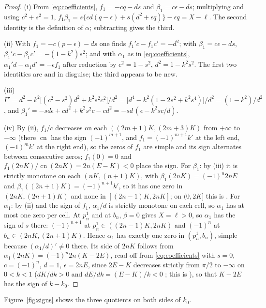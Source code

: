 \documentclass[11pt]{article}
\theoremstyle{remark}
\newcommand{\cn}{\operatorname{cn}}
\begin{document}
\begin{proof}
(i) From \eqref{eq:coefficients}, $f_1=-cq-ds$ and $\beta_1=c\epsilon-ds$;
multiplying and using $c^2+s^2=1$,
$f_1\beta_1=s\{cd(q-\epsilon)+s(d^2+\epsilon q)\}-\epsilon q=X-\ell$.
The second identity is the definition of $\alpha$; subtracting gives the third.

(ii) With $f_1=-c(p-\epsilon)-ds$ one finds $f_1'c-f_1c'=-d^2$; with
$\beta_1=c\epsilon-ds$, $\beta_1'c-\beta_1c'=-(1-k^2)s^2$; and with $\alpha_1$
as in \eqref{eq:coefficients}, $\alpha_1'd-\alpha_1d'=-\epsilon f_1$ after
reduction by $c^2=1-s^2$, $d^2=1-k^2s^2$.  The first two identities are
\cite[Lemma~5.3]{MoiseevSachkov2010Maxwell} and
\cite[Lemma~2.6]{Sachkov2010Conjugate} in disguise; the third appears to be new.

(iii) $\Gamma'=d^2-k^2\bigl[(c^2-s^2)d^2+k^2s^2c^2\bigr]/d^2
=\bigl[d^4-k^2(1-2s^2+k^2s^4)\bigr]/d^2=(1-k^2)/d^2$, and
$\beta_1'=-sd\epsilon+cd^2+k^2s^2c-cd^2=-sd\,(\epsilon-k^2sc/d)$.

(iv) By (ii), $f_1/c$ decreases on each $((2m+1)K,(2m+3)K)$ from
$+\infty$ to $-\infty$ (there $\cn$ has the sign $(-1)^{m+1}$, and
$f_1=(-1)^{m+1}k'$ at the left end, $(-1)^mk'$ at the right end), so
the zeros of $f_1$ are simple and its sign alternates between consecutive
zeros; $f_1(0)=0$ and $f_1(2nK)/\cn(2nK)=2n(E-K)<0$ place the sign.  For $\beta_1$:
by (iii) it is strictly monotone on each $(nK,(n+1)K)$, with
$\beta_1(2nK)=(-1)^n2nE$ and $\beta_1((2n+1)K)=(-1)^{n+1}k'$, so it has one
zero in $(2nK,(2n+1)K)$ and none in $[(2n-1)K,2nK]$; on $(0,2K]$ this is
\cite[Lemma~2.6]{Sachkov2010Conjugate}.  For $\alpha_1$: by (ii) and the
sign of $f_1$, $\alpha_1/d$ is strictly monotone on each cell, so
$\alpha_1$ has at most one zero per cell.  At $p_n^1$ and at $b_n$, $\beta=0$ gives $X=\ell>0$, so
$\alpha_1$ has the sign of $s$ there: $(-1)^{n+1}$ at $p_n^1\in((2n-1)K,2nK)$
and $(-1)^n$ at $b_n\in(2nK,(2n+1)K)$.  Hence $\alpha_1$ has exactly one
zero in $(p_n^1,b_n)$, simple because $(\alpha_1/d)'\ne0$ there.  Its side
of $2nK$ follows from $\alpha_1(2nK)=(-1)^n2n(K-2E)$, read off from
\eqref{eq:coefficients} with $s=0$, $c=(-1)^n$, $d=1$, $\epsilon=2nE$,
since $2E-K$ decreases strictly from $\pi/2$ to $-\infty$ on $0<k<1$
($dK/dk>0$ and $dE/dk=(E-K)/k<0$ \cite[\S19.4]{DLMF}; this is
\cite[Proposition~11.5]{Sachkov2008Elastic}), so that $K-2E$ has
the sign of $k-k_0$.
\end{proof}

Figure~\ref{fig:signs} shows the three quotients on both sides of $k_0$.
\end{document}
